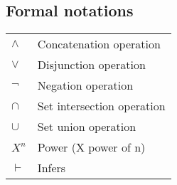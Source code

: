 \documentclass[titlepage]{book}
\begin{document}



\tableofcontents
\listoffigures
\listoftables

\newpage
\begin{center}
\section{Formal notations}
\begin{table}[h]
\centering
    \begin{tabular}{l  l}
        $\wedge$ & Concatenation operation \\
        $\vee$ & Disjunction operation \\
        $\neg$ & Negation operation \\
        $\cap$ & Set intersection operation \\
        $\cup$ & Set union operation \\
        $X^n$ & Power (X power of n) \\
        $\vdash$ & Infers

    \end{tabular}
\end{table}
\end{center}


\mainmatter

\setcounter{secnumdepth}{1}







\printindex

{}




\end{document}
